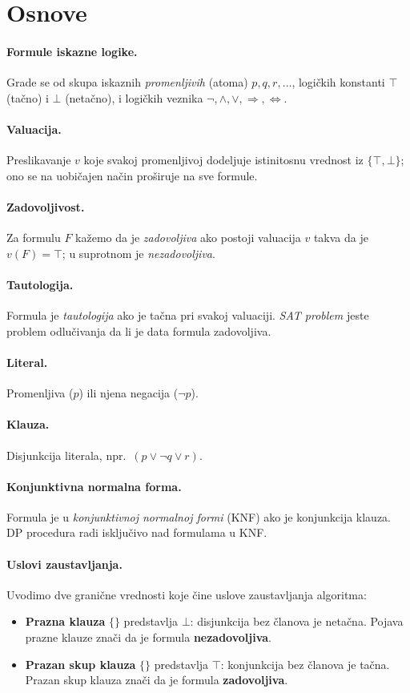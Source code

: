 \documentclass[a4paper,10pt]{article}
\begin{document}
\section{Osnove}
\label{sec:osnove}

\paragraph{Formule iskazne logike.} Grade se od skupa iskaznih \emph{promenljivih} (atoma) $p, q, r, \dots$, logičkih konstanti $\top$ (tačno) i $\bot$ (netačno), i logičkih veznika $\neg, \wedge, \vee, \Rightarrow, \Leftrightarrow$.
\paragraph{Valuacija.} Preslikavanje $v$ koje svakoj promenljivoj dodeljuje istinitosnu vrednost iz $\{\top, \bot\}$; ono se na uobičajen način proširuje na sve formule. 
\paragraph{Zadovoljivost.} Za formulu $F$ kažemo da je \emph{zadovoljiva} ako postoji valuacija $v$ takva da je $v(F) = \top$; u suprotnom je \emph{nezadovoljiva}.
\paragraph{Tautologija.}Formula je \emph{tautologija} ako je tačna pri svakoj valuaciji. \emph{SAT problem} jeste problem odlučivanja da li je data formula zadovoljiva.

 \paragraph{Literal.} Promenljiva ($p$) ili njena negacija ($\neg p$).
\paragraph{Klauza.} Disjunkcija literala, npr.\ $(p \vee \neg q \vee r)$.
\paragraph{Konjunktivna normalna forma.} Formula je u \emph{konjunktivnoj normalnoj formi} (KNF) ako je konjunkcija klauza. DP procedura radi isključivo nad formulama u KNF.

\paragraph{Uslovi zaustavljanja.}\label{par:uslovi_zaustavljanja} Uvodimo dve granične vrednosti koje čine uslove zaustavljanja algoritma:
\begin{itemize}
  \item \textbf{Prazna klauza} $\{\}$ predstavlja $\bot$: disjunkcija bez članova je netačna. Pojava prazne klauze znači da je formula \textbf{nezadovoljiva}.
  \item \textbf{Prazan skup klauza} $\{\}$ predstavlja $\top$: konjunkcija bez članova je tačna. Prazan skup klauza znači da je formula \textbf{zadovoljiva}.
\end{itemize}
\end{document}
